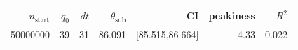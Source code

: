 \begin{tabular}{r r r r r r r}
\hline
$n_{\mathrm{start}}$ & $q_0$ & $dt$ & $\theta_{\mathrm{sub}}$ & CI & peakiness & $R^2$ \\
\hline
50000000 & 39 & 31 & 86.091 & [85.515,86.664] & 4.33 & 0.022 \\
\hline
\end{tabular}
